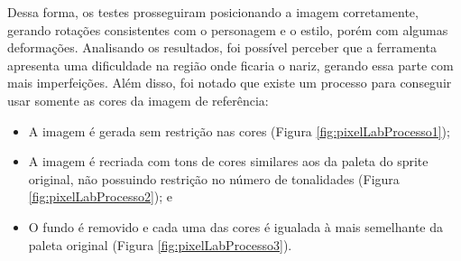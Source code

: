 Dessa forma, os testes prosseguiram posicionando a imagem corretamente, gerando rotações consistentes com o personagem e o estilo, porém com algumas deformações. Analisando os resultados, foi possível perceber que a ferramenta apresenta uma dificuldade na região onde ficaria o nariz, gerando essa parte com mais imperfeições. Além disso, foi notado que existe um processo para conseguir usar somente as cores da imagem de referência:
\begin{itemize}
    \item A imagem é gerada sem restrição nas cores (Figura \ref{fig:pixelLabProcesso1});
    \item A imagem é recriada com tons de cores similares aos da paleta do sprite original, não possuindo restrição no número de tonalidades (Figura \ref{fig:pixelLabProcesso2}); e
    \item O fundo é removido e cada uma das cores é igualada à mais semelhante da paleta original (Figura \ref{fig:pixelLabProcesso3}).
\end{itemize}

